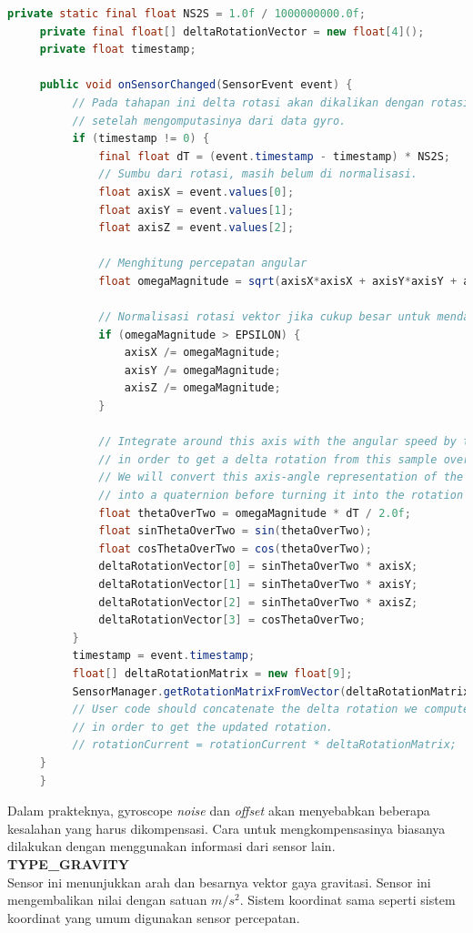 \begin{lstlisting}[caption=contoh implementasi gyroscope,label={lst:gryoscope-example},language=java]
	  private static final float NS2S = 1.0f / 1000000000.0f;
     private final float[] deltaRotationVector = new float[4]();
     private float timestamp;

     public void onSensorChanged(SensorEvent event) {
          // Pada tahapan ini delta rotasi akan dikalikan dengan rotasi saat ini
          // setelah mengomputasinya dari data gyro.
          if (timestamp != 0) {
              final float dT = (event.timestamp - timestamp) * NS2S;
              // Sumbu dari rotasi, masih belum di normalisasi.
              float axisX = event.values[0];
              float axisY = event.values[1];
              float axisZ = event.values[2];

              // Menghitung percepatan angular
              float omegaMagnitude = sqrt(axisX*axisX + axisY*axisY + axisZ*axisZ);

              // Normalisasi rotasi vektor jika cukup besar untuk mendapatkan sumbunya.
              if (omegaMagnitude > EPSILON) {
                  axisX /= omegaMagnitude;
                  axisY /= omegaMagnitude;
                  axisZ /= omegaMagnitude;
              }

              // Integrate around this axis with the angular speed by the time step
              // in order to get a delta rotation from this sample over the time step
              // We will convert this axis-angle representation of the delta rotation
              // into a quaternion before turning it into the rotation matrix.
              float thetaOverTwo = omegaMagnitude * dT / 2.0f;
              float sinThetaOverTwo = sin(thetaOverTwo);
              float cosThetaOverTwo = cos(thetaOverTwo);
              deltaRotationVector[0] = sinThetaOverTwo * axisX;
              deltaRotationVector[1] = sinThetaOverTwo * axisY;
              deltaRotationVector[2] = sinThetaOverTwo * axisZ;
              deltaRotationVector[3] = cosThetaOverTwo;
          }
          timestamp = event.timestamp;
          float[] deltaRotationMatrix = new float[9];
          SensorManager.getRotationMatrixFromVector(deltaRotationMatrix, deltaRotationVector);
          // User code should concatenate the delta rotation we computed with the current rotation
          // in order to get the updated rotation.
          // rotationCurrent = rotationCurrent * deltaRotationMatrix;
     }
     }
\end{lstlisting}
Dalam prakteknya, gyroscope \textit{noise} dan \textit{offset} akan menyebabkan beberapa kesalahan yang harus dikompensasi. Cara untuk mengkompensasinya biasanya dilakukan dengan menggunakan informasi dari sensor lain.\\
\textbf{TYPE\_GRAVITY}\\
Sensor ini menunjukkan arah dan besarnya vektor gaya gravitasi. Sensor ini mengembalikan nilai dengan satuan \(m/s^2\). Sistem koordinat sama seperti sistem koordinat yang umum digunakan sensor percepatan. 

